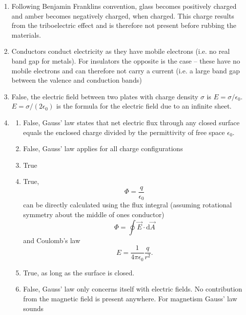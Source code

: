 {\color{AUred}
  \begin{answers}
    \begin{enumerate}
      \item Following Benjamin Franklins convention, glass becomes positively charged and amber becomes negatively charged, when charged.
        This charge results from the triboelectric effect and is therefore not present before rubbing the materials. 
      \item Conductors conduct electricity as they have mobile electrons (i.e. no real band gap for metals).
        For insulators the opposite is the case -- these have no mobile electrons and can therefore not carry a current (i.e. a large band gap between the valence and conduction bands)
      \item False, the electric field between two plates with charge density $\sigma$ is $E = \sigma / \epsilon_0$.
        $E = \sigma / (2 \epsilon_0)$ is the formula for the electric field due to an infinite sheet.
      \item \begin{enumerate}
          \item False, Gauss' law states that net electric flux through any closed surface equals the enclosed charge divided by the permittivity of free space $\epsilon_0$. 
          \item False, Gauss' law applies for all charge configurations
          \item True
          \item True,
            \begin{equation*}
              \Phi = \frac{q}{\epsilon_0}
            \end{equation*}
            can be directly calculated using the flux integral (assuming rotational symmetry about the middle of ones conductor)
            \begin{equation*}
              \Phi = \oint \Vec{E} \cdot \mathrm{d} \Vec{A}
            \end{equation*}
            and Coulomb's law
            \begin{equation*}
              E = \frac{1}{4\pi \epsilon_0} \frac{q}{r^2}
            .\end{equation*}
          \item True, as long as the surface is closed.
          \item False, Gauss' law only concerns itself with electric fields. No contribution from the magnetic field is present anywhere.
            For magnetism Gauss' law sounds

\end{enumerate}
\end{enumerate}
\end{answers}}
